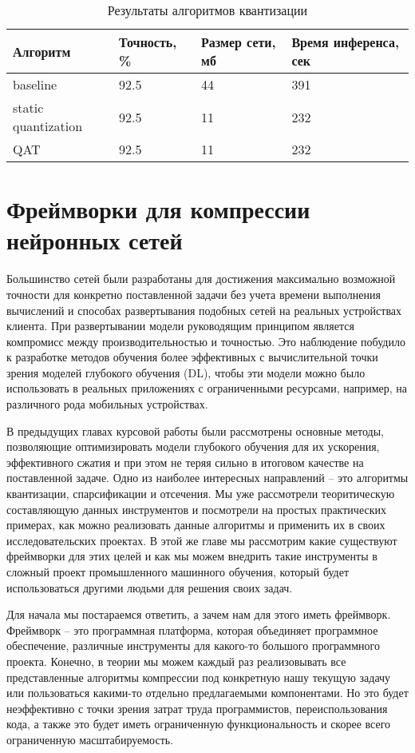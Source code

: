 \documentclass[oneside,final,12pt]{extreport}
\begin{document}
\begin{table}[H]
\caption{Результаты алгоритмов квантизации}
\label{table_3.1}
\begin{tabularx}{\textwidth}{|X|X|X|X|} %
\hline
Алгоритм & Точность, \% & Размер сети, мб & Время инференса, сек\\ \hline
baseline & 92.5 & 44 & 391\\ \hline 
static quantization &  92.5 & 11 & 232\\ \hline 
QAT & 92.5 & 11 & 232\\ \hline 
\end{tabularx}
\end{table}

\chapter{Фреймворки для компрессии нейронных сетей}
Большинство сетей были разработаны для достижения максимально возможной точности для конкретно поставленной задачи без учета времени выполнения вычислений и способах развертывания подобных сетей на реальных устройствах клиента. При развертывании модели руководящим принципом является компромисс между производительностью и точностью. Это наблюдение побудило к разработке методов обучения более эффективных с вычислительной точки зрения моделей глубокого обучения (DL), чтобы эти модели можно было использовать в реальных приложениях с ограниченными ресурсами, например, на различного рода мобильных устройствах. 

В предыдущих главах курсовой работы были рассмотрены основные методы, позволяющие оптимизировать модели глубокого обучения для их ускорения, эффективного сжатия и при этом не теряя сильно в итоговом качестве на поставленной задаче. Одно из наиболее интересных направлений – это алгоритмы квантизации, спарсификации и отсечения. Мы уже рассмотрели теоритическую составляющую данных инструментов и посмотрели на простых практических примерах, как можно реализовать данные алгоритмы и применить их в своих исследовательских проектах. В этой же главе мы рассмотрим какие существуют фреймворки для этих целей и как мы можем внедрить такие инструменты в сложный проект промышленного машинного обучения, который будет использоваться другими людьми для решения своих задач. 

Для начала мы постараемся ответить,  а зачем нам для этого иметь фреймворк. Фреймворк – это программная платформа, которая объединяет программное обеспечение, различные инструменты для какого-то большого программного проекта. Конечно, в теории мы можем каждый раз реализовывать все представленные алгоритмы компрессии под конкретную нашу текущую задачу или пользоваться какими-то отдельно предлагаемыми компонентами. Но это будет неэффективно с точки зрения затрат труда программистов, переиспользования кода,  а также это будет иметь ограниченную функциональность и скорее всего ограниченную масштабируемость.
\end{document}
